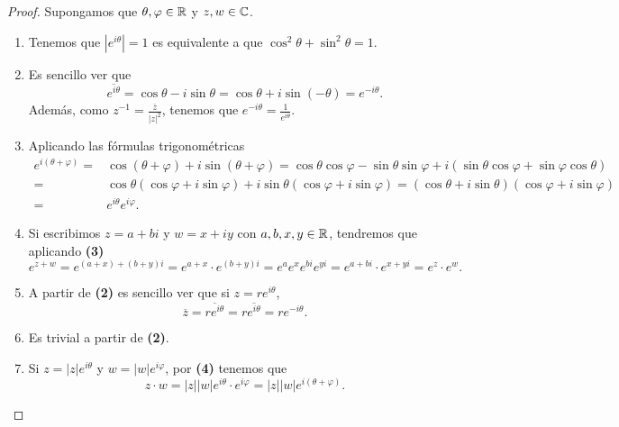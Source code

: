 \begin{proof}
Supongamos que $\displaystyle \theta, \varphi \in \mathbb{R} $ y $\displaystyle z, w \in \mathbb{C} $.
\begin{enumerate}
\item Tenemos que $\displaystyle \left|e^{i\theta }\right|=1 $ es equivalente a que $\displaystyle \cos^{2}\theta + \sin ^{2}\theta = 1 $. 
\item Es sencillo ver que 
	\[\overline{e^{i\theta}} = \cos\theta - i \sin \theta = \cos \theta + i \sin \left(-\theta \right)=e^{-i\theta} .\]
	Además, como $\displaystyle z^{-1}= \frac{\overline{z}}{ \left|z\right|^{2}} $, tenemos que $\displaystyle e^{-i\theta}=\frac{1}{e^{i\theta}} $. 
\item Aplicando las fórmulas trigonométricas
	\[
	\begin{split}
		e^{i\left(\theta + \varphi\right)} = & \cos\left(\theta + \varphi\right) + i \sin \left(\theta + \varphi\right) = \cos\theta \cos\varphi - \sin \theta \sin \varphi + i \left(\sin\theta \cos\varphi + \sin\varphi \cos \theta\right) \\
		= & \cos\theta\left(\cos\varphi + i\sin\varphi\right)+i\sin\theta\left(\cos\varphi + i \sin \varphi\right) = \left(\cos\theta + i \sin \theta\right)\left(\cos\varphi + i\sin\varphi\right)\\
		= & e^{i\theta}e^{i\varphi} .
	\end{split}
	\]
\item Si escribimos $\displaystyle z = a + bi $ y $\displaystyle w = x + iy $ con $\displaystyle a,b,x,y \in \mathbb{R} $, tendremos que aplicando \textbf{(3)} 
	\[e^{z + w}= e^{\left(a + x\right) + \left(b + y\right)i} = e^{a + x} \cdot e^{\left(b + y\right)i} = e^{a}e^{x} e^{bi}e^{yi}=e^{a + bi} \cdot e^{x + yi}= e^{z} \cdot e^{w}.\]
\item A partir de \textbf{(2)} es sencillo ver que si $\displaystyle z = re^{i\theta} $, 
	\[\overline{z}=\overline{re^{i\theta}}=r\overline{e^{i\theta}}=re^{-i\theta} .\]
\item Es trivial a partir de \textbf{(2)}.
\item Si $\displaystyle z = \left|z\right|e^{i\theta} $ y $\displaystyle w = \left|w\right|e^{i\varphi} $, por \textbf{(4)} tenemos que 
	\[z \cdot w = \left|z\right| \left|w\right|e^{i\theta} \cdot e^{i\varphi}= \left|z\right| \left|w\right| e^{i\left(\theta + \varphi\right)} .\]
\end{enumerate}
\end{proof}

